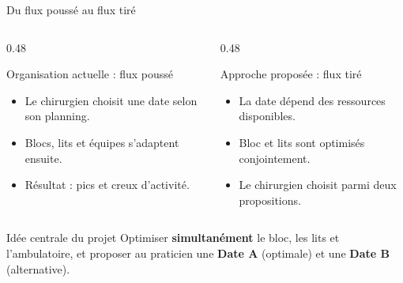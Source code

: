 \begin{frame}{Du flux poussé au flux tiré}
  \small
  \begin{columns}[T]
    \begin{column}{0.48\textwidth}
      \begin{block}{Organisation actuelle : flux poussé}
        \begin{itemize}
          \item Le chirurgien choisit une date selon son planning.
          \item Blocs, lits et équipes s'adaptent ensuite.
          \item Résultat : pics et creux d'activité.
        \end{itemize}
      \end{block}
    \end{column}
    \begin{column}{0.48\textwidth}
      \begin{block}{Approche proposée : flux tiré}
        \begin{itemize}
          \item La date dépend des ressources disponibles.
          \item Bloc et lits sont optimisés conjointement.
          \item Le chirurgien choisit parmi deux propositions.
        \end{itemize}
      \end{block}
    \end{column}
  \end{columns}

  \vspace{0.2cm}
  \begin{alertblock}{Idée centrale du projet}
    Optimiser \textbf{simultanément} le bloc, les lits et l'ambulatoire, et
    proposer au praticien une \textbf{Date A} (optimale) et une
    \textbf{Date B} (alternative).
  \end{alertblock}
\end{frame}

